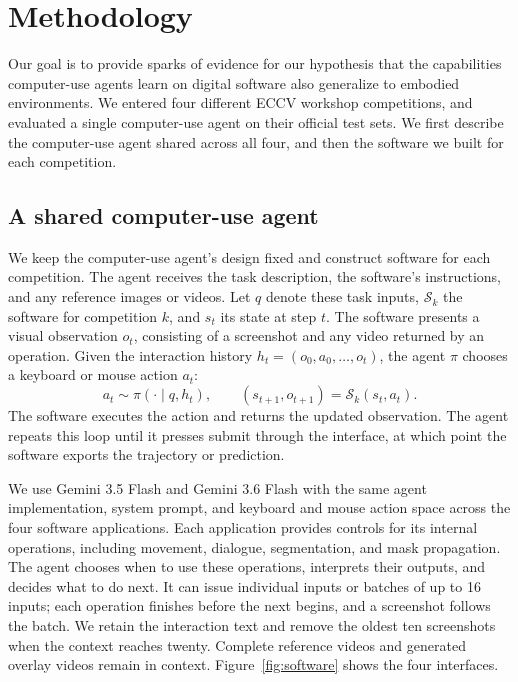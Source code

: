 \documentclass{article}
\begin{document}
\section{Methodology}
\label{sec:method}

Our goal is to provide sparks of evidence for our hypothesis that the capabilities computer-use agents learn on digital software also generalize to embodied environments. We entered four different ECCV workshop competitions, and evaluated a single computer-use agent on their official test sets. We first describe the computer-use agent shared across all four, and then the software we built for each competition.

\subsection{A shared computer-use agent}

We keep the computer-use agent's design fixed and construct software for each competition. The agent receives the task description, the software's instructions, and any reference images or videos. Let $q$ denote these task inputs, $\mathcal{S}_k$ the software for competition $k$, and $s_t$ its state at step $t$. The software presents a visual observation $o_t$, consisting of a screenshot and any video returned by an operation. Given the interaction history $h_t=(o_0,a_0,\ldots,o_t)$, the agent $\pi$ chooses a keyboard or mouse action $a_t$:
\begin{equation}
    a_t \sim \pi(\cdot\mid q,h_t),
    \qquad
    (s_{t+1},o_{t+1}) = \mathcal{S}_k(s_t,a_t).
\end{equation}
The software executes the action and returns the updated observation. The agent repeats this loop until it presses submit through the interface, at which point the software exports the trajectory or prediction.

We use Gemini 3.5 Flash and Gemini 3.6 Flash with the same agent implementation, system prompt, and keyboard and mouse action space across the four software applications. Each application provides controls for its internal operations, including movement, dialogue, segmentation, and mask propagation. The agent chooses when to use these operations, interprets their outputs, and decides what to do next. It can issue individual inputs or batches of up to 16 inputs; each operation finishes before the next begins, and a screenshot follows the batch. We retain the interaction text and remove the oldest ten screenshots when the context reaches twenty. Complete reference videos and generated overlay videos remain in context. Figure~\ref{fig:software} shows the four interfaces.
\end{document}
